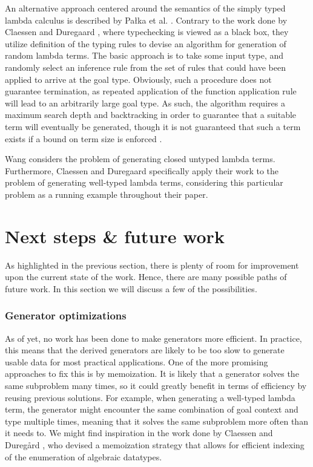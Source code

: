 \documentclass[a4paper,msc,twosized=semi]{uustthesis}
\begin{document}
  An alternative approach centered around the semantics of the simply typed lambda 
  calculus is described by Pa{\l}ka et al. \cite{palka2011testing}. Contrary to the 
  work done by Claessen and Duregaard \cite{claessen2015generating}, where 
  typechecking is viewed as a black box, they utilize definition of the typing rules 
  to devise an algorithm for generation of random lambda terms. The basic approach is 
  to take some input type, and randomly select an inference rule from the set of rules 
  that could have been applied to arrive at the goal type. Obviously, such a procedure 
  does not guarantee termination, as repeated application of the function application 
  rule will lead to an arbitrarily large goal type. As such, the algorithm requires a 
  maximum search depth and backtracking in order to guarantee that a suitable term 
  will eventually be generated, though it is not guaranteed that such a term exists if 
  a bound on term size is enforced \cite{moczurad2000statistical}. 

  Wang \cite{wang2005generating} considers the problem of generating closed untyped 
  lambda terms. Furthermore, Claessen and Duregaard \cite{claessen2015generating} 
  specifically apply their work to the problem of generating well-typed lambda terms, 
  considering this particular problem as a running example throughout their paper.  

\section{Next steps \& future work}

  As highlighted in the previous section, there is plenty of room for improvement upon 
  the current state of the work. Hence, there are many possible paths of future work. 
  In this section we will discuss a few of the possibilities. 

\subsubsection{Generator optimizations}

  As of yet, no work has been done to make generators more efficient. In practice, 
  this means that the derived generators are likely to be too slow to generate usable 
  data for most practical applications. One of the more promising approaches to fix 
  this is by memoization. It is likely that a generator solves the same subproblem 
  many times, so it could greatly benefit in terms of efficiency by reusing previous 
  solutions. For example, when generating a well-typed lambda term, the generator 
  might encounter the same combination of goal context and type multiple times, 
  meaning that it solves the same subproblem more often than it needs to. We might 
  find inspiration in the work done by Claessen and Dureg{\aa}rd \cite
  {duregaard2013feat}, who devised a memoization strategy that allows for efficient 
  indexing of the enumeration of algebraic datatypes. 
\end{document}
